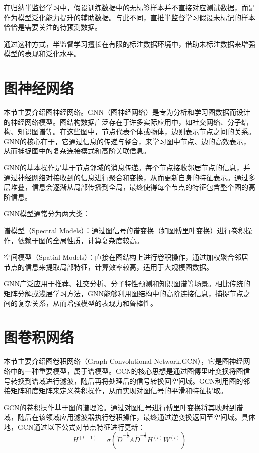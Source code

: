 \documentclass[promaster]{thesis-uestc}
\begin{document}
在归纳半监督学习中，假设训练数据中的无标签样本并不直接对应测试数据，而是作为模型泛化能力提升的辅助数据。与此不同，直推半监督学习假设未标记的样本恰恰是需要关注的待预测数据。

通过这种方式，半监督学习擅长在有限的标注数据环境中，借助未标注数据来增强模型的表现和泛化水平。
\section{图神经网络}

本节主要介绍图神经网络。GNN（图神经网络）是专为分析和学习图数据而设计的神经网络模型。图结构数据广泛存在于许多实际应用中，如社交网络、分子结构、知识图谱等。在这些图中，节点代表个体或物体，边则表示节点之间的关系。GNN的核心在于，它通过信息的传递与整合，来学习图中节点、边的高效表示，从而捕捉图中的复杂连接模式和高阶关联信息。

GNN的基本操作是基于节点邻域的消息传递。每个节点接收邻居节点的信息，并通过神经网络对接收到的信息进行聚合和变换，从而更新自身的特征表示。通过多层堆叠，信息会逐渐从局部传播到全局，最终使得每个节点的特征包含整个图的高阶信息。

GNN模型通常分为两大类：

谱模型（Spectral Models）：通过图信号的谱变换（如图傅里叶变换）进行卷积操作，依赖于图的全局性质，计算复杂度较高。

空间模型（Spatial Models）：直接在图结构上进行卷积操作，通过加权聚合邻居节点的信息来提取局部特征，计算效率较高，适用于大规模图数据。

GNN广泛应用于推荐、社交分析、分子特性预测和知识图谱等场景。相比传统的矩阵分解或浅层学习方法，GNN能够利用图结构中的高阶连接信息，捕捉节点之间的复杂关系，从而增强模型的表现力和鲁棒性。

\section{图卷积网络}

本节主要介绍图卷积网络（Graph Convolutional Network,GCN），它是图神经网络中的一种重要模型，属于谱模型。GCN的核心思想是通过图傅里叶变换将图信号转换到谱域进行滤波，随后再将处理后的信号转换回空间域。GCN利用图的邻接矩阵和度矩阵来定义卷积操作，从而实现对图信号的平滑和特征提取。

GCN的卷积操作基于图的谱理论。通过对图信号进行傅里叶变换将其映射到谱域，随后在该领域应用滤波器执行卷积操作，最终通过逆变换返回至空间域。具体地，GCN通过以下公式对节点特征进行更新：
\begin{equation}
H^{(l+1)} = \sigma(\tilde{D}^{-\frac{1}{2}}\tilde{A}\tilde{D}^{-\frac{1}{2}}H^{(l)}W^{(l)})
\end{equation}
\end{document}
